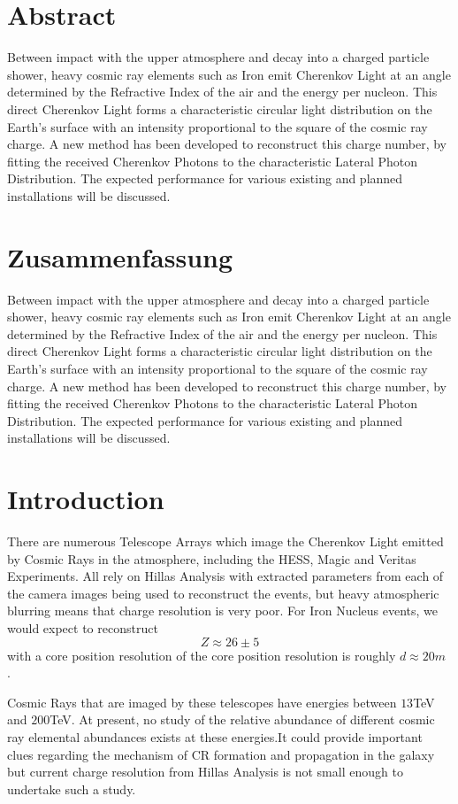 \documentclass{article}
\begin{document}
\section*{Abstract}
Between impact with the upper atmosphere and decay into a charged particle shower, heavy cosmic ray elements such as Iron emit Cherenkov Light at an angle determined by the Refractive Index of the air and the energy per nucleon. This direct Cherenkov Light forms a characteristic circular light distribution on the Earth's surface with an intensity proportional to the square of the cosmic ray charge. A new method has been developed to reconstruct this charge number, by fitting the received Cherenkov Photons to the characteristic Lateral Photon Distribution. The expected performance for various existing and planned installations will be discussed.

\section*{Zusammenfassung}
Between impact with the upper atmosphere and decay into a charged particle shower, heavy cosmic ray elements such as Iron emit Cherenkov Light at an angle determined by the Refractive Index of the air and the energy per nucleon. This direct Cherenkov Light forms a characteristic circular light distribution on the Earth's surface with an intensity proportional to the square of the cosmic ray charge. A new method has been developed to reconstruct this charge number, by fitting the received Cherenkov Photons to the characteristic Lateral Photon Distribution. The expected performance for various existing and planned installations will be discussed.
\newpage
\tableofcontents
\newpage
\section{Introduction}
There are numerous Telescope Arrays which image the Cherenkov Light emitted by Cosmic Rays in the atmosphere, including the HESS, Magic and Veritas Experiments. All rely on Hillas Analysis with extracted parameters from each of the camera images being used to reconstruct the events, but heavy atmospheric blurring means that charge resolution is very poor. For Iron Nucleus events, we would expect to reconstruct \[Z \approx 26 \pm 5 \] with a core position resolution of the core position resolution is roughly $d \approx 20 m $ \cite{hess07}. 

Cosmic Rays that are imaged by these telescopes have energies between $13 $TeV and $200 $TeV. At present, no study of the relative abundance of different cosmic ray elemental abundances exists at these energies.It could provide important clues regarding the mechanism of CR formation and propagation in the galaxy but current charge resolution from Hillas Analysis is not small enough to undertake such a study.
\end{document}
